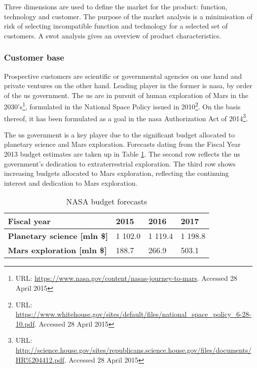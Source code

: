 Three dimensions are used to define the market for the product: function, technology and customer. The purpose of the market analysis is a minimisation of risk of selecting incompatible function and technology for a selected set of customers. A \gls{swot} analysis gives an overview of product characteristics.

\subsubsection{Customer base}
Prospective customers are scientific or governmental agencies on one hand and private ventures on the other hand. Leading player in the former is \gls{nasa}, by order of the \gls{us} government. The \gls{us} are in pursuit of human exploration of Mars in the 2030's\footnote{URL: \url{https://www.nasa.gov/content/nasas-journey-to-mars}.  Accessed 28 April 2015}, formulated in the National Space Policy issued in 2010\footnote{URL: \url{https://www.whitehouse.gov/sites/default/files/national\_space\_policy\_6-28-10.pdf}. Accessed 28 April 2015}. On the basis thereof, it has been formulated as a goal in the \gls{nasa} Authorization Act of 2014\footnote{URL: \url{http://science.house.gov/sites/republicans.science.house.gov/files/documents/HR\%204412.pdf}. Accessed 28 April 2015}.

The \gls{us} government is a key player due to the significant budget allocated to planetary science and Mars exploration. Forecasts dating from the Fiscal Year 2013 budget estimates \cite{NASA2014a} are taken up in Table \ref{tab:cashbudgets}. The second row reflects the \gls{us} government's dedication to extraterrestrial exploration. The third row shows increasing budgets allocated to Mars exploration, reflecting the continuing interest and dedication to Mars exploration.

\begin{table}
\centering
\caption{NASA budget forecasts}
\label{tab:cashbudgets}
\begin{tabular}{|l|l|l|l|}
\hline
{\bf Fiscal year}                    & 2015     & 2016    & 2017    \\ \hline
{\bf Planetary science {[}mln \${]}} & 1 102.0 & 1 119.4 & 1 198.8 \\ \hline
{\bf Mars exploration {[}mln \${]}}  & 188.7   & 266.9   & 503.1   \\ \hline
\end{tabular}
\end{table}

